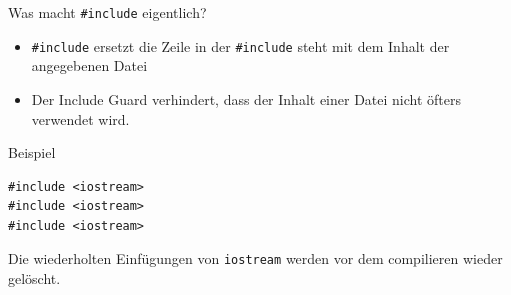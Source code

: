\documentclass[presentation]{beamer}
\begin{document}
\begin{frame}[label={sec:orgd2a97c8},fragile]{Was macht {\color{solarizedYellow}\texttt{\#include} }eigentlich?}
 \begin{itemize}
\item {\color{solarizedYellow}\texttt{\#include} }ersetzt die Zeile in der {\color{solarizedYellow}\texttt{\#include} }steht mit dem Inhalt
der angegebenen Datei
\item Der \alert{Include Guard} verhindert, dass der Inhalt einer Datei nicht
öfters verwendet wird.
\end{itemize}
\begin{block}{Beispiel}
\begin{verbatim}
#include <iostream>
#include <iostream>
#include <iostream>
\end{verbatim}
Die wiederholten Einfügungen von {\color{solarizedYellow}\texttt{iostream} }werden vor dem compilieren
wieder gelöscht.
\end{block}
\end{frame}
\end{document}
